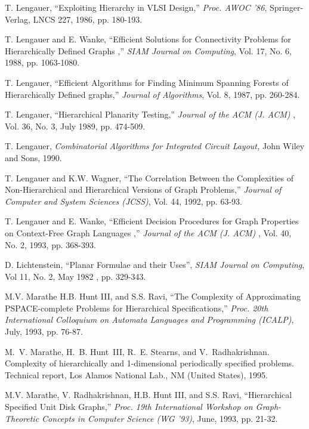 \begin{thebibliography}{HMRR93}
T. Lengauer,
``Exploiting Hierarchy in VLSI Design,''
{\em Proc.  AWOC '86}, 
Springer-Verlag, LNCS 227, 1986, pp. 180-193.
	
T. Lengauer and  E. Wanke,
``Efficient Solutions for Connectivity Problems for Hierarchically  
Defined Graphs ,''
{\em SIAM Journal on Computing}, 
Vol. 17, No. 6, 1988, pp. 1063-1080.




T. Lengauer,
``Efficient Algorithms for Finding Minimum Spanning Forests of 
Hierarchically Defined graphs,''
{\em Journal of Algorithms}, Vol. 8, 1987, pp. 260-284.


T. Lengauer,
``Hierarchical Planarity Testing,''
{\em Journal of the ACM (J. ACM) }, 
Vol. 36, No. 3, July 1989, pp. 474-509.


T. Lengauer,
{\em Combinatorial Algorithms for Integrated Circuit Layout,}
John Wiley and Sons, 1990.


T. Lengauer and  K.W. Wagner,
``The Correlation Between the Complexities of Non-Hierarchical and
Hierarchical Versions of Graph Problems,''
{\em Journal of Computer and System Sciences (JCSS)}, 
Vol. 44,  1992, pp. 63-93. 



T. Lengauer and  E. Wanke,
``Efficient Decision Procedures for Graph Properties on Context-Free 
Graph Languages ,''
{\em Journal of the ACM (J. ACM) }, 
Vol. 40, No. 2, 1993, pp. 368-393.

 D. Lichtenstein,
``Planar Formulae and their Uses'', 
{\em SIAM Journal on Computing},
Vol 11, No. 2, May 1982 , pp. 329-343.

 M.V. Marathe H.B. Hunt III,  and S.S. Ravi,
``The Complexity of Approximating {PSPACE}-complete Problems for 
Hierarchical Specifications,''
{\em Proc. 20th 
International Colloquium on Automata Languages and Programming (ICALP)}, 
July, 1993, pp. 76-87.

M.~V. Marathe, H.~B. Hunt~III, R.~E. Stearns, and V.~Radhakrishnan.
\newblock Complexity of hierarchically and 1-dimensional periodically specified
  problems.
\newblock Technical report, Los Alamos National Lab., NM (United States), 1995.


M.V. Marathe, V. Radhakrishnan,  H.B. Hunt III,  and S.S. Ravi,
``Hierarchical Specified Unit Disk Graphs,''
{\em Proc. 19th International 
Workshop on Graph-Theoretic Concepts in Computer Science (WG '93)}, 
June, 1993, pp. 21-32. 





\end{thebibliography}
